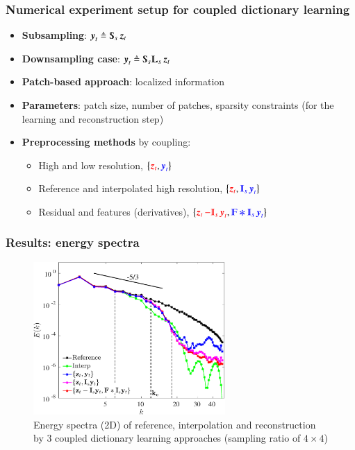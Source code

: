 \documentclass{beamer}
\let\olditem\item
\renewcommand{\item}{\setlength{\itemsep}{\fill}\olditem}
\begin{document}
\begin{frame}
	\frametitle{Numerical experiment setup for coupled dictionary learning} 
	\begin{itemize} %
	\item \textbf{Subsampling}: $ \y_t \mydef \Sub_s\z_t $
	
	\item \textbf{Downsampling case}: $ \y_t \mydef \Sub_s\LPF_s\z_t $
	\item \textbf{Patch-based approach}: localized information
	\item \textbf{Parameters}: patch size, number of patches, sparsity constraints (for the learning and reconstruction step)
	\item \textbf{Preprocessing methods} by coupling:
		\begin{itemize}
			\item High and low resolution, $ \left\lbrace \textcolor{red}{\operatorname{\boldsymbol{z}}_t}, \textcolor{blue}{\operatorname{\boldsymbol{y}}_t} \right\rbrace $
			\item Reference and interpolated high resolution, $ \left\lbrace \textcolor{red}{\z_t}, \textcolor{blue}{\Interp_s\y_t} \right\rbrace $
			\item Residual and features (derivatives), $ \left\lbrace \textcolor{red}{\z_t - \Interp_s\y_t}, \textcolor{blue}{\varmathbb{F} \Conv \Interp_s\y_t} \right\rbrace $
		\end{itemize}
	\end{itemize}
\end{frame}

\begin{frame}
	\frametitle{Results: energy spectra} 

	\begin{figure}
		\centering \includegraphics[width=0.65\textwidth]{./figures/DL/spectra2d_spacespacing_04.eps}
		\caption*{Energy spectra (2D) of reference, interpolation and reconstruction by 3 coupled dictionary learning approaches (sampling ratio of $ 4 \times 4 $)}
	\end{figure}
\end{frame}
\end{document}
